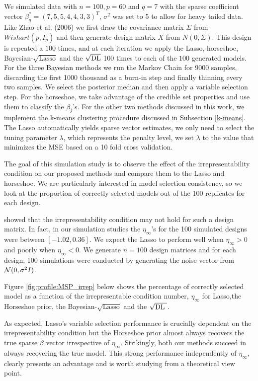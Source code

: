 \documentclass[10pt]{article}
\def\sql{$\sqrt{\text{Lasso}}$}
\def\sqdl{$\sqrt{\text{\rm{DL} }}$}
\begin{document}
We simulated data with $n = 100, p = 60$ and $q = 7$ with the sparse coefficient vector $\beta_{q}^* = (7,5,5,4,4,3,3)^T$, $\sigma^2$ was set to $5$ to allow for heavy tailed data. Like Zhao et al. (2006) we first draw the covariance matrix $\Sigma$ from $Wishart(p, I_p)$ and then generate design matrix $X$ from $N(0,\Sigma)$. This design is repeated a $100$ times, and at each iteration we apply the Lasso, horseshoe, Bayesian-$\sqrt{\text{Lasso}}$ and the $\sqrt{\text{\rm{DL}}}$ 100 times to each of the $100$ generated models. For the three Bayesian methods we run the Markov Chain for 9000 samples, discarding the first 1000 thousand as a burn-in step and finally thinning every two samples. We select the posterior median and then apply a variable selection step. For the horseshoe, we take advantage of the credible set properties and use them to classify the $\beta_j$'s. For the other two methods discussed in this work, we implement the k-means clustering procedure discussed in Subsection \ref{k-means}. The Lasso automatically yields sparse vector estimates, we only need to select the tuning parameter $\lambda$, which represents the penalty level, we set $\lambda$ to the value that minimizes the MSE based on a 10 fold cross validation.

The goal of this simulation study is to observe the effect of the irrepresentability condition on our proposed methods and compare them to the Lasso and horseshoe. We are particularly interested in model selection consistency, so we look at the proportion of correctly selected models out of the 100 replicates for each design.

\citet{zhao2006model} showed that the irrepresentability condition may not hold for such a design matrix. In fact, in our simulation studies the $\eta_\infty$'s for the 100 simulated designs were between $[-1.02, 0.36]$. We expect the Lasso to perform well when $\eta_\infty>0$ and poorly when $\eta_\infty<0$. We generate $n = 100$ design matrices and for each design, 100 simulations were conducted by generating the noise vector from $\mathcal{N}(0, \sigma^2 I)$.

Figure \ref{fig:profile:MSP_irrep} below shows the percentage of correctly selected model as a function of the irrepresentable condition number, $\eta_\infty$ for Lasso,the Horseshoe prior, the Bayesian-\sql{} and the \sqdl{}.

As expected, Lasso's variable selection performance is crucially dependent on the irrepresentability condition but the Horseshoe prior almost always recovers the true sparse $\beta$ vector irrespective of $\eta_\infty$. Strikingly, both our methods succeed in always recovering the true model. This strong performance independently of  $\eta_\infty$, clearly presents an advantage and is worth studying from a theoretical view point.
\end{document}
